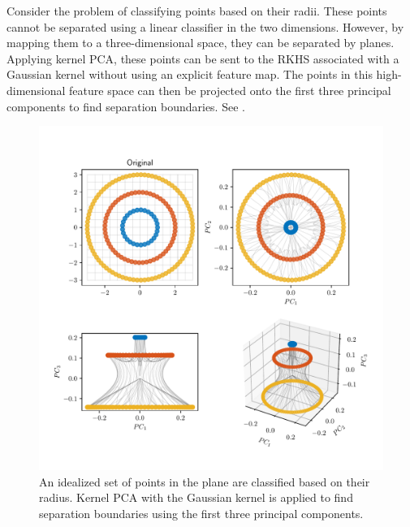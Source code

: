\begin{example}
    Consider the problem of classifying points based on their radii.
    These points cannot be separated using a linear classifier in the two dimensions.
    However, by mapping them to a three-dimensional space, they can be separated by planes.
    Applying kernel PCA, these points can be sent to the RKHS associated with a Gaussian kernel without using an explicit feature map.
    The points in this high-dimensional feature space can then be projected onto the first three principal components to find separation boundaries.
    See .
    \begin{figure}
        \includegraphics[width=\textwidth]{figs/fig_kpca_example.pdf}
        \caption{An idealized set of points in the plane are classified based on their radius. Kernel PCA with the Gaussian kernel is applied to find separation boundaries using the first three principal components.}
        \label{fig:gaussian-kpca-example}
    \end{figure}
\end{example}

